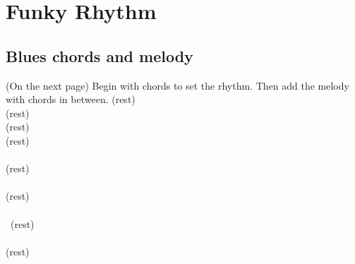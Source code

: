 \section{Funky Rhythm}


    \subsection{Blues chords and melody}
        (On the next page)
        Begin with chords to set the rhythm. 
        Then add the melody with chords in between.
        \newpage    
            \ottd \ottb \ottd (rest)\\    
            \ottd \ottb \ottd (rest)\\
            \ottd \ottb \ottd (rest)\\    
            \ottd \ottb \ottd (rest)\\    
        \2 \3 \4  \\
        \ottd \ottb \ottd (rest)\\    
        \4\fdb\3\2   \\
        \ottd \ottb \ottd (rest)\\    
        \2 \3 \4\\\
        \ottd \ottb \ottd (rest)\\    
        \4\fdb\3\2        \\    
        \ottd \ottb \ottd (rest)\\    